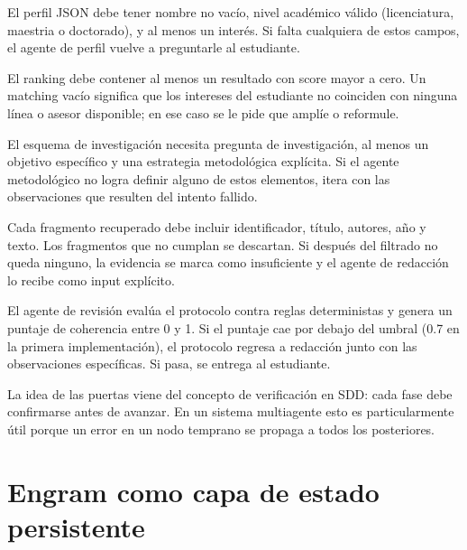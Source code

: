 \documentclass[12pt, a4paper]{article}
\begin{document}
\begin{description}[style=nextline, leftmargin=2.5cm]
    \item[$V_1$: Perfil $\to$ Matching]
    El perfil JSON debe tener nombre no vacío, nivel académico válido
    (licenciatura, maestria o doctorado), y al menos un interés. Si falta
    cualquiera de estos campos, el agente de perfil vuelve a preguntarle
    al estudiante.

    \item[$V_2$: Matching $\to$ Metodológico]
    El ranking debe contener al menos un resultado con score mayor a cero.
    Un matching vacío significa que los intereses del estudiante no
    coinciden con ninguna línea o asesor disponible; en ese caso se le
    pide que amplíe o reformule.

    \item[$V_3$: Metodológico $\to$ Investigador]
    El esquema de investigación necesita pregunta de investigación, al
    menos un objetivo específico y una estrategia metodológica explícita.
    Si el agente metodológico no logra definir alguno de estos elementos,
    itera con las observaciones que resulten del intento fallido.

    \item[$V_4$: Investigador $\to$ Redacción]
    Cada fragmento recuperado debe incluir identificador, título, autores,
    año y texto. Los fragmentos que no cumplan se descartan. Si después
    del filtrado no queda ninguno, la evidencia se marca como
    insuficiente y el agente de redacción lo recibe como input explícito.

    \item[$V_5$: Revisión $\to$ Entrega]
    El agente de revisión evalúa el protocolo contra reglas deterministas
    y genera un puntaje de coherencia entre 0 y 1. Si el puntaje cae por
    debajo del umbral (0.7 en la primera implementación), el protocolo
    regresa a redacción junto con las observaciones específicas. Si pasa,
    se entrega al estudiante.
\end{description}

La idea de las puertas viene del concepto de verificación en SDD: cada fase
debe confirmarse antes de avanzar. En un sistema multiagente esto es
particularmente útil porque un error en un nodo temprano se propaga a todos
los posteriores.

\section{Engram como capa de estado persistente}
\end{document}
